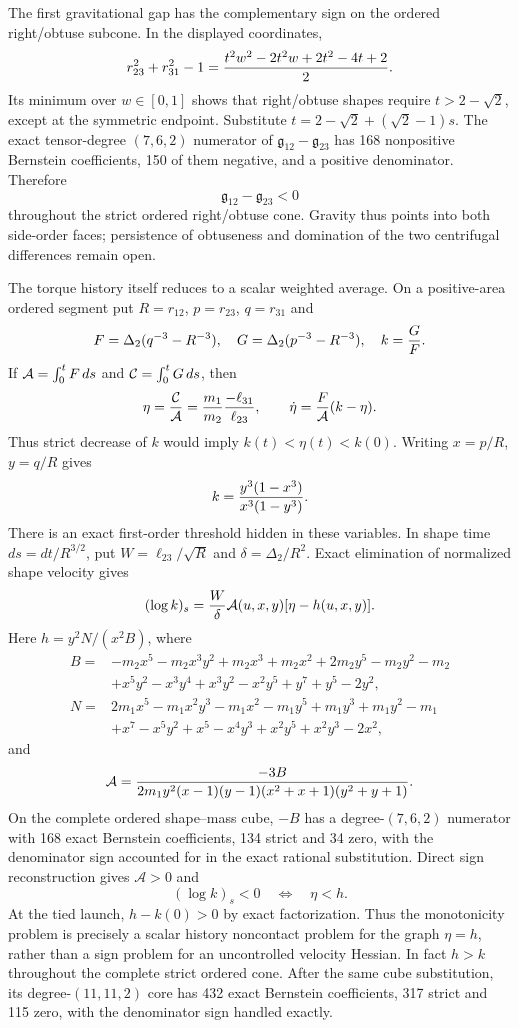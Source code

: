 \documentclass[11pt]{article}
\begin{document}
The first gravitational gap has the complementary sign on the ordered
right/obtuse subcone. In the displayed coordinates,
\[
r_{23}^2+r_{31}^2-1=
{t^2w^2-2t^2w+2t^2-4t+2\over2}.
\]
Its minimum over $w\in[0,1]$ shows that right/obtuse shapes require
$t>2-\sqrt2$, except at the symmetric endpoint. Substitute
$t=2-\sqrt2+(\sqrt2-1)s$.  The exact tensor-degree $(7,6,2)$ numerator of
$\mathfrak g_{12}-\mathfrak g_{23}$ has 168 nonpositive Bernstein
coefficients, 150 of them negative, and a positive denominator. Therefore
\[
\mathfrak g_{12}-\mathfrak g_{23}<0
\]
throughout the strict ordered right/obtuse cone. Gravity thus points into
both side-order faces; persistence of obtuseness and domination of the two
centrifugal differences remain open.

The torque history itself reduces to a scalar weighted average.  On a
positive-area ordered segment put $R=r_{12}$, $p=r_{23}$, $q=r_{31}$ and
\[
 F=\Delta_2(q^{-3}-R^{-3}),\quad
 G=\Delta_2(p^{-3}-R^{-3}),\quad
 k={G\over F}.
\]
If ${\cal A}=\int_0^tF\,ds$ and ${\cal C}=\int_0^tG\,ds$, then
\[
 \eta={{\cal C}\over{\cal A}}
 ={m_1\over m_2}{-\ell_{31}\over\ell_{23}},\qquad
 \dot\eta={F\over{\cal A}}(k-\eta).
\]
Thus strict decrease of $k$ would imply $k(t)<\eta(t)<k(0)$.  Writing
$x=p/R$, $y=q/R$ gives
\[
 k={y^3(1-x^3)\over x^3(1-y^3)}.
\]
There is an exact first-order threshold hidden in these variables.  In shape
time $ds=dt/R^{3/2}$, put $W=\ell_{23}/\sqrt R$ and
$\delta=\Delta_2/R^2$.  Exact elimination of normalized shape velocity gives
\[
 (\log k)_s={W\over\delta}\mathcal A(u,x,y)
 [\eta-h(u,x,y)].
\]
Here $h=y^2N/(x^2B)$, where
\[
\begin{aligned}
B={}&-m_2x^5-m_2x^3y^2+m_2x^3+m_2x^2+2m_2y^5-m_2y^2-m_2\\
&+x^5y^2-x^3y^4+x^3y^2-x^2y^5+y^7+y^5-2y^2,\\
N={}&2m_1x^5-m_1x^2y^3-m_1x^2-m_1y^5+m_1y^3+m_1y^2-m_1\\
&+x^7-x^5y^2+x^5-x^4y^3+x^2y^5+x^2y^3-2x^2,
\end{aligned}
\]
and
\[
 \mathcal A={-3B\over
 2m_1y^2(x-1)(y-1)(x^2+x+1)(y^2+y+1)}.
\]
On the complete ordered shape--mass cube, $-B$ has a degree-$(7,6,2)$
numerator with 168 exact Bernstein coefficients, 134 strict and 34 zero,
with the denominator sign accounted for in the exact rational
substitution. Direct sign reconstruction gives $\mathcal A>0$ and
\[
 (\log k)_s<0\quad\Longleftrightarrow\quad\eta<h.
\]
At the tied launch, $h-k(0)>0$ by exact factorization.  Thus the monotonicity
problem is precisely a scalar history noncontact problem for the graph
$\eta=h$, rather than a sign problem for an uncontrolled velocity Hessian.
In fact $h>k$ throughout the complete strict ordered cone.  After the same
cube substitution, its degree-$(11,11,2)$ core has 432 exact Bernstein
coefficients, 317 strict and 115 zero, with the denominator sign handled
exactly.
\end{document}
